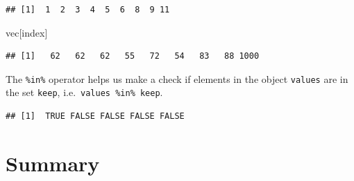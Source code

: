 \documentclass[
]{book}
\newenvironment{Shaded}{\begin{snugshade}}{\end{snugshade}}
\newcommand{\CommentTok}[1]{\textcolor[rgb]{0.56,0.35,0.01}{\textit{#1}}}
\newcommand{\KeywordTok}[1]{\textcolor[rgb]{0.13,0.29,0.53}{\textbf{#1}}}
\newcommand{\NormalTok}[1]{#1}
\newcommand{\OperatorTok}[1]{\textcolor[rgb]{0.81,0.36,0.00}{\textbf{#1}}}
\newcommand{\StringTok}[1]{\textcolor[rgb]{0.31,0.60,0.02}{#1}}
\begin{document}
\begin{verbatim}
## [1]  1  2  3  4  5  6  8  9 11
\end{verbatim}

\begin{Shaded}
\begin{Highlighting}[]
\NormalTok{vec[index]}
\end{Highlighting}
\end{Shaded}

\begin{verbatim}
## [1]   62   62   62   55   72   54   83   88 1000
\end{verbatim}

The \texttt{\%in\%} operator helps us make a check if elements in the object \texttt{values} are in the set \texttt{keep}, i.e.~\texttt{values\ \%in\%\ keep}.

\begin{Shaded}
\end{Shaded}

\begin{verbatim}
## [1]  TRUE FALSE FALSE FALSE FALSE
\end{verbatim}

\hypertarget{summary-3}{%
\section*{Summary}\label{summary-3}}
\end{document}
